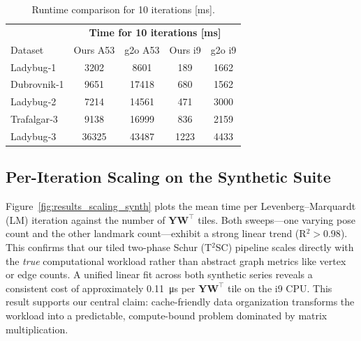 \begin{table}[!htbp]
\caption{Runtime comparison for 10 iterations [ms].}
\label{tab:results_runtime}
\centering
\begin{tabular}{@{}lcccc@{}}
\toprule
& \multicolumn{4}{c}{\textbf{Time for 10 iterations [ms]}} \\
\cmidrule(lr){2-5}
Dataset & Ours A53 & g2o A53 & Ours i9 & g2o i9 \\
\midrule
Ladybug‑1   & 3202 & 8601 & 189 & 1662 \\
Dubrovnik‑1 & 9651 & 17418 & 680 & 1562 \\
Ladybug‑2   & 7214 & 14561 & 471 & 3000 \\
Trafalgar‑3 & 9138 & 16999 & 836 & 2159 \\
Ladybug‑3   & 36325 & 43487 & 1223 & 4433 \\
\bottomrule
\end{tabular}
\end{table}

\subsection{Per-Iteration Scaling on the Synthetic Suite}
\label{subsec:results_itercost}
Figure~\ref{fig:results_scaling_synth} plots the mean time per
Levenberg–Marquardt (LM) iteration against the number of
$\mathbf Y\mathbf W^{\!\top}$ tiles. Both sweeps—one varying pose count and the other landmark 
count—exhibit a strong linear trend (R$^{2}\!>\!0.98$). This confirms that our tiled two-phase 
Schur (T$^{2}$SC) pipeline scales directly with the \emph{true} computational workload rather 
than abstract graph metrics like vertex or edge counts. A unified linear fit across both 
synthetic series reveals a consistent cost of approximately \SI{0.11}{\micro\second} per 
$\mathbf Y\mathbf W^{\!\top}$ tile on the i9 CPU. This result supports our central claim: 
cache-friendly data organization transforms the workload into a predictable, compute-bound 
problem dominated by matrix multiplication.

